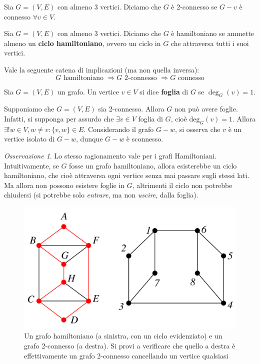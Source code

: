 \documentclass[oneside]{book}
\theoremstyle{remark}
\newtheorem*{osservaz}{Osservazione}
\begin{document}
\begin{tcolorbox}[colback=yellow!30, colframe=yellow!30!black, title=Grafo 2-connesso]
Sia $G=(V,E)$ con almeno 3 vertici. Diciamo che $G$ è 2-connesso se $G-v$ è
connesso $\forall v \in V$.
\end{tcolorbox}

\begin{tcolorbox}[colback=yellow!30, colframe=yellow!30!black, title=Grafo Hamiltoniano]
Sia $G=(V,E)$ con almeno 3 vertici. Diciamo che $G$ è hamiltoniano se ammette
almeno un \textbf{ciclo hamiltoniano}, ovvero un ciclo in $G$ che attraversa
tutti i suoi vertici.
\end{tcolorbox}
\noindent Vale la seguente catena di implicazioni (ma non quella inversa):
\[ G \text{ hamiltoniano } \Longrightarrow G \text{ 2-connesso } \Longrightarrow G \text{ connesso} \]
\begin{tcolorbox}[colback=yellow!30, colframe=yellow!30!black, title=Foglia]
Sia $G=(V,E)$ un grafo. Un vertice $v\in V$ si dice \textbf{foglia} di $G$
se $\deg_G(v)=1$.
\end{tcolorbox}
\noindent Supponiamo che $G=(V,E)$ sia 2-connesso. Allora $G$ non
può avere foglie. Infatti, si supponga per assurdo che $\exists v\in V$
foglia di $G$, cioè $\text{deg}_G(v)=1$. Allora $\exists!w\in V,w\not=v:\{v,w\}\in E$.
Considerando il grafo $G-w$, si osserva che $v$ è un vertice isolato di
$G-w$, dunque $G-w$ è sconnesso.
\begin{osservaz}
Lo stesso ragionamento vale per i grafi Hamiltoniani. Intuitivamente,
se $G$ fosse un grafo hamiltoniano, allora esisterebbe un ciclo hamiltoniano,
che cioè attraversa ogni vertice senza mai passare sugli stessi lati.
Ma allora non possono esistere foglie in $G$, altrimenti il ciclo
non potrebbe chiudersi (si potrebbe solo \emph{entrare}, ma non \emph{uscire}, dalla
foglia).
\end{osservaz}

\begin{figure}[H]
\centering
\includegraphics[scale = 0.4]{figures/2-conn-vs-hamilton.pdf}
\caption{Un grafo hamiltoniano (a sinistra, con un ciclo evidenziato) e un grafo 2-connesso (a destra).
Si provi a verificare che quello a destra è effettivamente un grafo 2-connesso
cancellando un vertice qualsiasi}
\end{figure}
\end{document}
